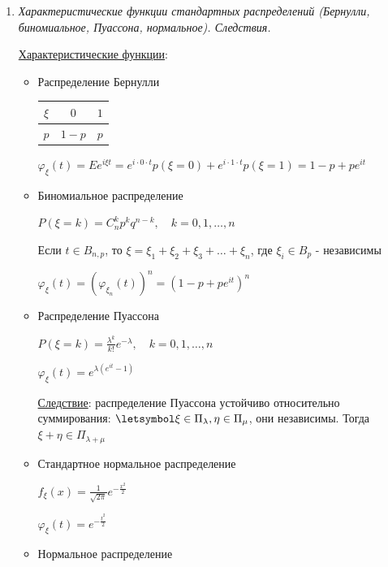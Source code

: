 \documentclass[12pt]{article}
\begin{document}
\begin{enumerate}
\begin{enumerate}
        $\{\xi_n\} \rightrightarrows \xi \Longleftrightarrow \varphi_{\xi_n}(t) \longrightarrow \varphi_\xi(t) \forall t \in \Real$
    \end{enumerate}

    \item \textit{Характеристические функции стандартных распределений (Бернулли, биномиальное, Пуассона, нормальное). Следствия.}

    \hyperlink{characteristicfunctionofstandarddistributions}{Характеристические функции}: 

    \begin{itemize}
        \item Распределение Бернулли

        \begin{tabular}{c|c|c}
            $\xi$ & $0$     & $1$    \\
            \hline
            $p$   & $1 - p$ & $p$
        \end{tabular} \qquad\qquad $\varphi_\xi(t) = Ee^{i\xi t} = e^{i \cdot 0 \cdot t} p(\xi = 0) + e^{i \cdot 1 \cdot t} p(\xi = 1) = 1 - p + p e^{it}$

        \item Биномиальное распределение

        $P(\xi = k) = C_n^k p^k q^{n - k}, \quad k = 0, 1, \dots, n$

        Если $t \in B_{n,p}$, то $\xi = \xi_1 + \xi_2 + \xi_3 + \dots + \xi_n$, где $\xi_i \in B_p$ - независимы

        $\varphi_\xi(t) = (\varphi_{\xi_n}(t))^n = (1 - p + p e^{it})^n$

        \item Распределение Пуассона

        $P(\xi = k) = \frac{\lambda^k}{k!} e^{-\lambda}, \quad k = 0, 1, \dots, n$

        $\varphi_\xi(t) = e^{\lambda (e^{it} - 1)}$

        \underline{Следствие}: распределение Пуассона устойчиво относительно суммирования: $\letsymbol \xi \in \Pi_\lambda, \eta \in \Pi_\mu$, они независимы. Тогда $\xi + \eta \in \Pi_{\lambda + \mu}$

        \item Стандартное нормальное распределение

        $f_\xi(x) = \frac{1}{\sqrt{2\pi}} e^{-\frac{x^2}{2}}$

        $\varphi_\xi(t) = e^{-\frac{t^2}{2}}$

        \item Нормальное распределение


\end{itemize}
\end{enumerate}
\end{document}
